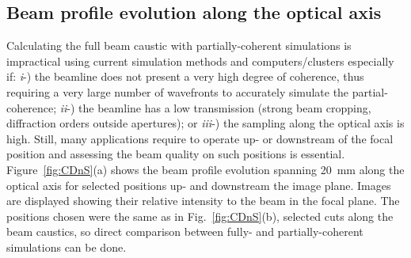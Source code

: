 \begin{refsection}
\subsection{Beam profile evolution along the optical axis}\label{sec:partcaustics_sim}

Calculating the full beam caustic with partially-coherent simulations is impractical using current simulation methods and computers/clusters especially if: \textit{i}-)  the beamline does not present a very high degree of coherence, thus requiring a very large number of wavefronts to accurately simulate the partial-coherence; \textit{ii}-) the beamline has a low transmission (strong beam cropping, diffraction orders outside apertures); or \textit{iii}-) the sampling along the optical axis is high. Still, many applications require to operate up- or downstream of the focal position and assessing the beam quality on such positions is essential. Figure~\ref{fig:CDnS}(a) shows the beam profile evolution spanning 20~mm along the optical axis for selected positions up- and downstream the image plane. Images are displayed showing their relative intensity to the beam in the focal plane. The positions chosen were the same as in Fig.~\ref{fig:CDnS}(b), selected cuts along the beam caustics, so direct comparison between fully- and partially-coherent simulations can be done.

\clearpage


\end{refsection}
